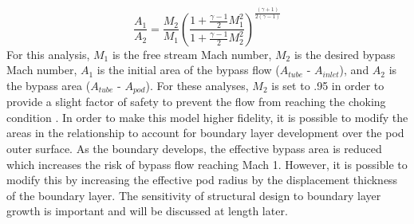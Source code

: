 	\begin{equation}
		\label{eq:mach_to_area}
		\frac{A_{1}}{A_{2}}=\frac{M_{2}}{M_{1}} ( \frac{1+\frac{\gamma -1}{2}M_{1}^{2}}{1+\frac{\gamma -1}{2}M_{2}^{2}} )^{\frac{( \gamma +1 )}{2 ( \gamma -1  )}}
	\end{equation}
	For this analysis, $M_1$ is the free stream Mach number, $M_2$ is the desired bypass Mach number, $A_1$ is the initial area of the bypass flow ($A_{tube}$ - $A_{inlet}$), and $A_2$ is the bypass area ($A_{tube}$ - $A_{pod}$). For these analyses, $M_2$ is set to .95 in order to provide a slight factor of safety to prevent the flow from reaching the choking condition .
	In order to make this model higher fidelity, it is possible to modify the areas in the relationship to account for boundary layer development over the pod outer surface. As the boundary develops, the effective bypass area is reduced which increases the risk of bypass flow reaching Mach 1. However, it is possible to modify this by increasing the effective pod radius by the displacement thickness of the boundary layer. The sensitivity of structural design to boundary layer growth is important and will be discussed at length later.
